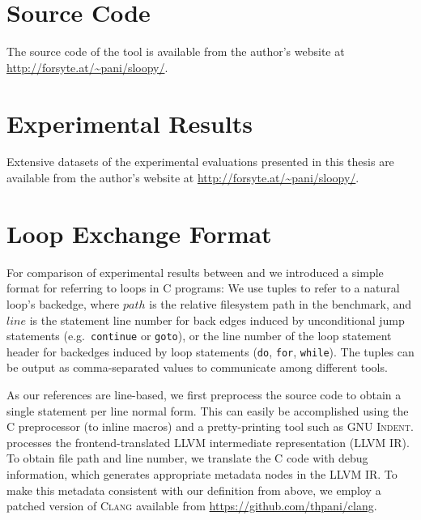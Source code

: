 \section{Source Code}

The source code of the \sloopy{} tool is available from the author's website at\\\url{http://forsyte.at/~pani/sloopy/}.

\section{Experimental Results}

Extensive datasets of the experimental evaluations presented in this thesis are available from the author's website at \url{http://forsyte.at/~pani/sloopy/}.

\section{Loop Exchange Format}

For comparison of experimental results between \sloopy{} and \loopus{} we introduced a simple format for referring to loops in C programs: We use tuples  to refer to a natural loop's backedge, where $path$ is the relative filesystem path in the benchmark, and $line$ is the statement line number for back edges induced by unconditional jump statements (e.g.\ \texttt{continue} or \texttt{goto}), or the line number of the loop statement header for backedges induced by loop statements (\texttt{do}, \texttt{for}, \texttt{while}). The tuples can be output as comma-separated values to communicate among different tools.

As our references are line-based, we first preprocess the source code to obtain a single statement per line normal form. This can easily be accomplished using the C preprocessor (to inline macros) and a pretty-printing tool such as \textsc{GNU Indent}. \loopus{} processes the frontend-translated LLVM intermediate representation (LLVM IR). To obtain file path and line number, we translate the C code with debug information, which generates appropriate metadata nodes in the LLVM IR. To make this metadata consistent with our definition from above, we employ a patched version of \textsc{Clang} available from \url{https://github.com/thpani/clang}.
